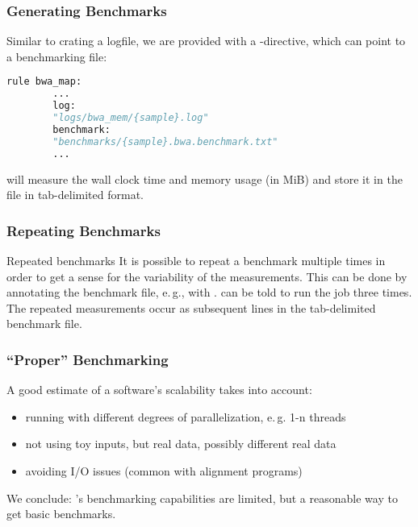 \begin{frame}[fragile]
	\frametitle{Generating Benchmarks}
	Similar to crating a logfile, we are provided with a -directive, which can point to a benchmarking file:
	\begin{lstlisting}[language=Python,style=Python]
		rule bwa_map:
		...
		log:
		"logs/bwa_mem/{sample}.log"
		benchmark:
		"benchmarks/{sample}.bwa.benchmark.txt"
		...
	\end{lstlisting} 
	\begin{docs}
		\Snakemake{} will measure the wall clock time and memory usage (in MiB) and store it in the file in tab-delimited format.
	\end{docs}
\end{frame}

\begin{frame}[fragile]
	\frametitle{Repeating Benchmarks}
	\vfill
	\begin{exampleblock}{Repeated benchmarks}
		It is possible to repeat a benchmark multiple times in order to get a sense for the variability of the measurements. This can be done by annotating the benchmark file, e.\,g., with . \Snakemake{} can be told to run the job three times. The repeated measurements occur as subsequent lines in the tab-delimited benchmark file.
	\end{exampleblock}
	\vfill
\end{frame} 

\begin{frame}
	\frametitle{``Proper'' Benchmarking}
	A good estimate of a software's scalability takes into account:
	\begin{itemize}[<+->]
		\item running with different degrees of parallelization, e.\,g. 1-n threads
		\item not using toy inputs, but real data, possibly different real data
		\item avoiding I/O issues (common with alignment programs)
	\end{itemize}
	\pause
	\begin{warning}
		We conclude: \Snakemake's benchmarking capabilities are limited, but a reasonable way to get basic benchmarks.
	\end{warning}
\end{frame}
